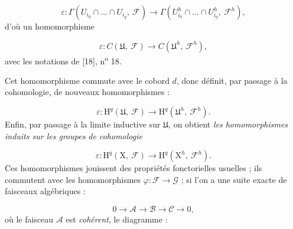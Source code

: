 \begin{equation*}
\varepsilon : \Gamma(U_{i_0} \cap \ldots \cap U_{i_q}, \ \mathcal{F}) \to \Gamma(U^h_{i_0} \cap \ldots \cap U^h_{i_q}, \ \mathcal{F}^h),
\end{equation*}
d'où un homomorphisme

\begin{equation*}
\varepsilon : C(\mathfrak{U}, \ \mathcal{F}) \to C(\mathfrak{U}^h, \ \mathcal{F}^h),
\end{equation*}
avec les notations de [18], n\textsuperscript{o} 18.



Cet homomorphisme commute avec le cobord $d$, donc définit, par passage à la cohomologie, de nouveaux homomorphismes :

\begin{equation*}
\varepsilon : \mathrm{H}^q(\mathfrak{U},\ \mathcal{F}) \longrightarrow \mathrm{H}^q(\mathfrak{U}^h,\ \mathcal{F}^h).
\end{equation*}
Enfin, par passage à la limite inductive sur $\mathfrak{U}$, on obtient \textit{les homomorphismes induits sur les groupes de cohomologie}

\begin{equation*}
\varepsilon : \mathrm{H}^q(\mathrm{X},\ \mathcal{F}) \longrightarrow \mathrm{H}^q(\mathrm{X}^h,\ \mathcal{F}^h).
\end{equation*}
Ces homomorphismes jouissent des propriétés fonctorielles usuelles ; ils commutent avec les homomorphismes $\varphi : \mathcal{F} \longrightarrow \mathcal{G}$ ; si l'on a une suite exacte de faisceaux algébriques :

\begin{equation*}
0 \longrightarrow \mathcal{A} \longrightarrow \mathcal{B} \longrightarrow \mathcal{C} \longrightarrow 0,
\end{equation*}
où le faisceau $\mathcal{A}$ est \textit{cohérent}, le diagramme :

